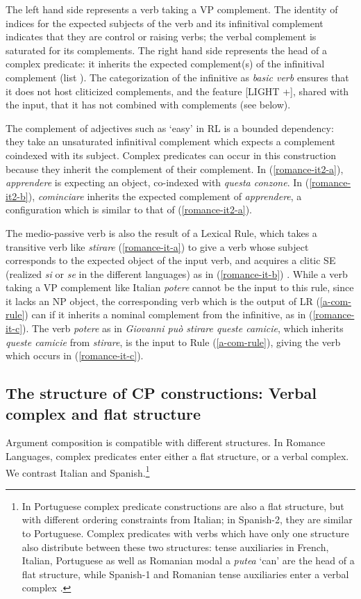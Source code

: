 \documentclass[output=paper]{langsci/langscibook}
\begin{document}
The left hand side represents a verb taking a VP complement. The identity of indices for the expected subjects of the verb and its infinitival complement indicates that they are control or raising verbs; the verbal complement is saturated for its complements. The right hand side represents the head of a complex predicate: it inherits the expected complement(s) of the infinitival complement (list ). The categorization of the infinitive as \textit{basic verb} ensures that it does not host cliticized complements, and the feature [LIGHT +], shared with the input, that it has not combined with complements (see below).  

The complement of adjectives such as ‘easy’ in RL is a bounded dependency: they take an unsaturated infinitival complement which expects a complement coindexed with its subject. Complex predicates can occur in this construction because they inherit the complement of their complement. In (\ref{romance-it2-a}), \textit{apprendere} is expecting an object, co-indexed with \textit{questa conzone}. In (\ref{romance-it2-b}), \textit{cominciare} inherits the expected complement of \textit{apprendere}, a configuration which is similar to that of (\ref{romance-it2-a}). 


The medio-passive verb is also the result of a Lexical Rule, which takes a transitive verb like \textit{stirare} (\ref{romance-it-a}) to give a verb whose subject corresponds to the expected object of the input verb, and acquires a clitic SE (realized \textit{si} or \textit{se} in the different languages) as in (\ref{romance-it-b}) \citep{Monachesi98a}. While a verb taking a VP complement like Italian \textit{potere} cannot be the input to this rule, since it lacks an NP object, the corresponding verb which is the output of LR (\ref{a-com-rule}) can if it inherits a nominal complement from the infinitive, as in (\ref{romance-it-c}). The verb \textit{potere} as in \textit{Giovanni pu\`o stirare queste camicie}, which inherits \textit{queste camicie} from \textit{stirare}, is the input to Rule  (\ref{a-com-rule}), giving the verb which occurs in (\ref{romance-it-c}). 

\subsection{The structure of CP constructions: Verbal complex and flat structure}

Argument composition is compatible with different structures. In Romance Languages, complex predicates enter either a flat structure, or a verbal complex. We contrast Italian and Spanish.\footnote{In Portuguese complex predicate constructions are also a flat structure, but with different ordering constraints from Italian; in Spanish-2, they are similar to Portuguese. Complex predicates with verbs which have only one structure also distribute between these two structures: tense auxiliaries in French, Italian, Portuguese as well as Romanian modal a \textit{putea} `can' are the head of a flat structure, while Spanish-1 and Romanian tense auxiliaries enter a verbal complex \citep{AG2010}.}
\end{document}
